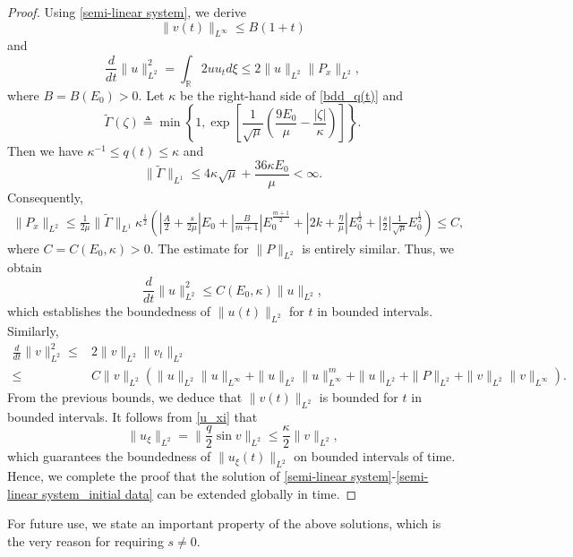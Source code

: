 \documentclass[10pt]{article}
\numberwithin{equation}{section}
\begin{document}
\begin{proof}
		Using \eqref{semi-linear system}, we derive
		$$\|v(t)\|_{L^\infty}\leq B(1+t)$$
		and 
		$$
		\frac{d}{dt}\|u\|_{L^2}^2=\int_{\mathbb{R}}2uu_td\xi\leq2\|u\|_{L^2}\|P_x\|_{L^2},
		$$
		where $B=B(E_0)>0$. Let $\kappa$ be the right-hand side of \eqref{bdd_q(t)} and 
		\begin{equation*}
			\widetilde{\Gamma}(\zeta)\triangleq\min\left\{1,\exp\left[\frac{1}{\sqrt{\mu}}\left(\frac{9E_0}{\mu}-\frac{|\zeta|}{\kappa}\right)\right]\right\}.
		\end{equation*}
		Then we have $\kappa^{-1}\leq q(t)\leq\kappa$ and
		\begin{equation*}
			\|\widetilde{\Gamma}\|_{L^1}\leq 4\kappa\sqrt{\mu}+\frac{36\kappa E_0}{\mu}<\infty.
		\end{equation*}
		Consequently,
		\begin{align*}
			\|P_x\|_{L^2}\leq\frac{1}{2\mu}\|\widetilde{\Gamma}\|_{L^1}\kappa^{\frac{1}{2}}\left(\left|\frac{A}{2}+\frac{s}{2\mu}\right|E_0+\left|\frac{B}{m+1}\right|E_0^{\frac{m+1}{2}}+\left|2k+\frac{\eta}{\mu}\right|E_0^{\frac{1}{2}}+\left|\frac{s}{2}\right|\frac{1}{\sqrt{\mu}}E_0^{\frac{1}{2}}\right)\leq C,
		\end{align*}
		where $C=C(E_0,\kappa)>0$. The estimate for $\|P\|_{L^2}$ is entirely similar. Thus, we obtain
		$$
		\frac{d}{dt}\|u\|_{L^2}^2\leq C(E_0,\kappa)\|u\|_{L^2},
		$$
		which establishes the boundedness of $\|u(t)\|_{L^2}$ for $t$ in bounded intervals. Similarly, 
		\begin{align*}
			\frac{d}{dt}\|v\|_{L^2}^2\leq&2\|v\|_{L^2}\|v_t\|_{L^2}\\
			\leq& C\|v\|_{L^2}\left(\|u\|_{L^2}\|u\|_{L^\infty}+\|u\|_{L^2}\|u\|_{L^\infty}^{m}+\|u\|_{L^2}+\|P\|_{L^2}+\|v\|_{L^2}\|v\|_{L^\infty}\right).
		\end{align*}
		From the previous bounds, we deduce that $\|v(t)\|_{L^2}$ is bounded for $t$ in bounded intervals. It follows from \eqref{u_xi} that
		$$\|u_\xi\|_{L^2}=\|\frac{q}{2}\sin v\|_{L^2}\leq\frac{\kappa}{2}\|v\|_{L^2},$$
		which guarantees the boundedness of $\|u_\xi(t)\|_{L^2}$ on bounded intervals of time. Hence, we complete the proof that the solution of \eqref{semi-linear system}-\eqref{semi-linear system_initial data} can be extended globally in time.
	\end{proof}
	
	For future use, we state an important property of the above solutions, which is the very reason for requiring $s\neq0$.
	
\end{document}
